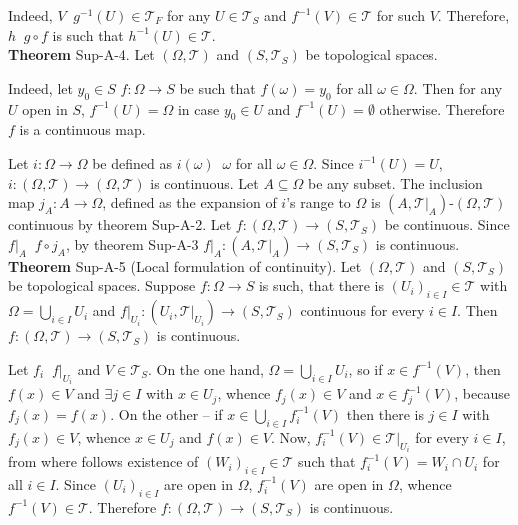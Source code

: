 \documentclass[a4paper]{article}
\newcommand{\brac}[1]{\left ( #1 \right )}
\newcommand{\induc}[1]{\left . #1 \right \vert}
\newcommand{\Tcal}{\mathcal{T}}
\newcommand{\defn}{\mathop{\overset{\Delta}{=}}\nolimits}
\begin{document}
Indeed, $V\defn g^{-1}\brac{U}\in \Tcal_F$ for any $U\in \Tcal_S$ and $f^{-1}\brac{V}\in \Tcal$ for such $V$. Therefore, $h\defn g\circ f$ is such that $h^{-1}\brac{U} \in \Tcal$.\\

\label{thm:cont_prop_3} \noindent \textbf{Theorem} Sup-A-4.
Let $\brac{\Omega,\Tcal}$ and $\brac{S,\Tcal_S}$ be topological spaces.

Indeed, let $y_0\in S$ $f:\Omega\to S$ be such that $f\brac{\omega}=y_0$ for all $\omega \in \Omega$. Then for any $U$ open in $S$, $f^{-1}\brac{U}=\Omega$ in case $y_0\in U$ and $f^{-1}\brac{U}=\emptyset$ otherwise. Therefore $f$ is a continuous map.

Let $i:\Omega\to \Omega$ be defined as $i\brac{\omega}\defn\omega$ for all $\omega\in \Omega$. Since $i^{-1}\brac{U}=U$, $i:\brac{\Omega, \Tcal}\to\brac{\Omega, \Tcal}$ is continuous. Let $A\subseteq \Omega$ be any subset. The inclusion map $j_A:A \to \Omega$, defined as the expansion of $i$'s range to $\Omega$ is $\brac{A,\induc{\Tcal}_A}$-$\brac{\Omega, \Tcal}$ continuous by theorem Sup-A-2. Let $f:\brac{\Omega,\Tcal}\to \brac{S,\Tcal_S}$ be continuous. Since $\induc{f}_A\defn f\circ j_A$, by theorem Sup-A-3 $\induc{f}_A:\brac{A, \induc{\Tcal}_A}\to\brac{S,\Tcal_S}$ is continuous.\\

\label{thm:local_cont} \noindent \textbf{Theorem} Sup-A-5 (Local formulation of continuity).
Let $\brac{\Omega,\Tcal}$ and $\brac{S,\Tcal_S}$ be topological spaces. Suppose $f:\Omega\to S$ is such, that there is $\brac{U_i}_{i\in I}\in \Tcal$ with $\Omega = \bigcup_{i\in I} U_i$ and $\induc{f}_{U_i}:\brac{U_i, \induc{\Tcal}_{U_i}}\to \brac{S, \Tcal_S}$ continuous for every $i\in I$. Then $f:\brac{\Omega, \Tcal}\to \brac{S, \Tcal_S}$ is continuous.

Let $f_i\defn \induc{f}_{U_i}$ and $V\in \Tcal_S$. On the one hand, $\Omega=\bigcup_{i\in I} U_i$, so if $x\in f^{-1}\brac{V}$, then $f\brac{x}\in V$ and $\exists j\in I$ with $x\in U_j$, whence $f_j\brac{x}\in V$ and $x\in f^{-1}_j\brac{V}$, because $f_j\brac{x}=f\brac{x}$. On the other -- if $x\in \bigcup_{i\in I} f^{-1}_i\brac{V}$ then there is $j\in I$ with $f_j\brac{x}\in V$, whence $x\in U_j$ and $f\brac{x}\in V$. Now, $f^{-1}_i\brac{V}\in \induc{\Tcal}_{U_i}$ for every $i\in I$, from where follows existence of $\brac{W_i}_{i\in I}\in\Tcal$ such that $f^{-1}_i\brac{V} = W_i \cap U_i$ for all $i\in I$. Since $\brac{U_i}_{i\in I}$ are open in $\Omega$, $f^{-1}_i\brac{V}$ are open in $\Omega$, whence $f^{-1}\brac{V}\in \Tcal$. Therefore $f:\brac{\Omega, \Tcal}\to \brac{S, \Tcal_S}$ is continuous.\\
\end{document}
